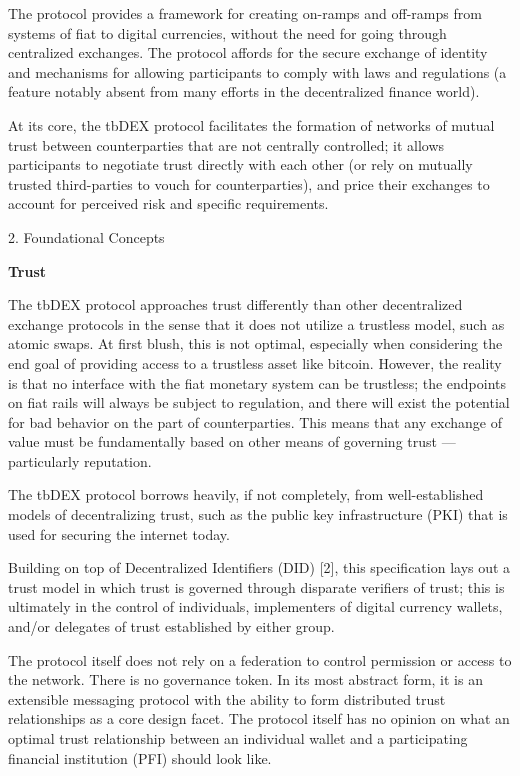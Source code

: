 \documentclass[
]{article}
\begin{document}
The protocol provides a framework for creating on-ramps and off-ramps
from systems of fiat to digital currencies, without the need for going
through centralized exchanges. The protocol affords for the secure
exchange of identity and mechanisms for allowing participants to comply
with laws and regulations (a feature notably absent from many efforts in
the decentralized finance world).

At its core, the tbDEX protocol facilitates the formation of networks of
mutual trust between counterparties that are not centrally controlled;
it allows participants to negotiate trust directly with each other (or
rely on mutually trusted third-parties to vouch for counterparties), and
price their exchanges to account for perceived risk and specific
requirements.

2. Foundational Concepts

\textbf{Trust}

The tbDEX protocol approaches trust differently than other decentralized
exchange protocols in the sense that it does not utilize a trustless
model, such as atomic swaps. At first blush, this is not optimal,
especially when considering the end goal of providing access to a
trustless asset like bitcoin. However, the reality is that no interface
with the fiat monetary system can be trustless; the endpoints on fiat
rails will always be subject to regulation, and there will exist the
potential for bad behavior on the part of counterparties. This means
that any exchange of value must be fundamentally based on other means of
governing trust --- particularly reputation.

The tbDEX protocol borrows heavily, if not completely, from
well-established models of decentralizing trust, such as the public key
infrastructure (PKI) that is used for securing the internet today.

Building on top of Decentralized Identifiers (DID) {[}2{]}, this
specification lays out a trust model in which trust is governed through
disparate verifiers of trust; this is ultimately in the control of
individuals, implementers of digital currency wallets, and/or delegates
of trust established by either group.

The protocol itself does not rely on a federation to control permission
or access to the network. There is no governance token. In its most
abstract form, it is an extensible messaging protocol with the ability
to form distributed trust relationships as a core design facet. The
protocol itself has no opinion on what an optimal trust relationship
between an individual wallet and a participating financial institution
(PFI) should look like.
\end{document}
